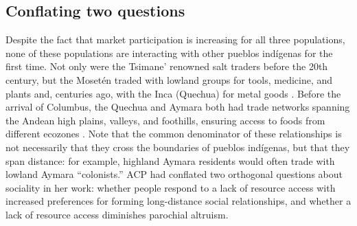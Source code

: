 \documentclass[bibauthoryear]{aa}
\begin{document}
\subsection{Conflating two questions}\label{twoquest}
Despite the fact that market participation is increasing for all three populations, none of these populations are interacting with other pueblos ind\'igenas for the first time. Not only were the Tsimane' renowned salt traders before the 20th century, but the Moset\'en traded with lowland groups for tools, medicine, and plants \citep{lathrap1973antiquity, ringhofer2010exploring} and, centuries ago, with the Inca (Quechua) for metal goods \citep{godoy2015natural}. Before the arrival of Columbus, the Quechua and Aymara both had trade networks spanning the Andean high plains, valleys, and foothills, ensuring access to foods from different ecozones \citep{klein2011concise}. Note that the common denominator of these relationships is not necessarily that they cross the boundaries of pueblos ind\'igenas, but that they span distance: for example, highland Aymara residents would often trade with lowland Aymara ``colonists.'' ACP had conflated two orthogonal questions about sociality in her work: whether people respond to a lack of resource access with increased preferences for forming long-distance social relationships, and whether a lack of resource access diminishes parochial altruism.
\end{document}
